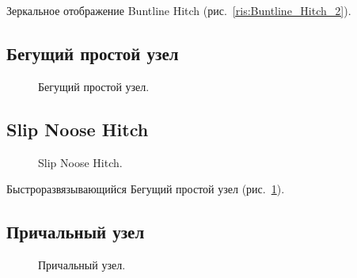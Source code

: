 Зеркальное отображение Buntline Hitch (рис.~\ref{ris:Buntline_Hitch_2}).

\subsection{Бегущий простой узел}

\begin{figure}[H]\centering
	\begin{minipage}{1\linewidth}
		\begin{center}
			\tcbox[enhanced jigsaw,colframe=black,opacityframe=0.5,opacityback=0.5]
			{\centering{}}
		\end{center}
	\end{minipage}
\caption{Бегущий простой узел.}
\label{ris:Simple_sliding}
\end{figure}

\subsection{Slip Noose Hitch}

\begin{figure}[H]\centering
	\begin{minipage}{1\linewidth}
		\begin{center}
			\tcbox[enhanced jigsaw,colframe=black,opacityframe=0.5,opacityback=0.5]
			{\centering{}}
		\end{center}
	\end{minipage}
\caption{Slip Noose Hitch.}
\label{ris:Slip_Noose_Hitch}
\end{figure}

Быстроразвязывающийся Бегущий простой узел (рис.~\ref{ris:Simple_sliding}).

\subsection{Причальный узел}

\begin{figure}[H]\centering
	\begin{minipage}{1\linewidth}
		\begin{center}
			\tcbox[enhanced jigsaw,colframe=black,opacityframe=0.5,opacityback=0.5]
			{\centering{}}
		\end{center}
	\end{minipage}
\caption{Причальный узел.}
\label{ris:Prichalny}
\end{figure}

